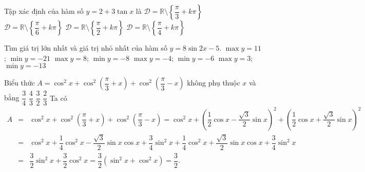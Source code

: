 \begin{ex}%
Tập xác định của hàm số $y=2+3\tan x$ là
\choice
{$\mathscr{D}=\mathbb{R}\setminus\left\{\dfrac{\pi}{3}+k\pi\right\}$}
{$\mathscr{D}=\mathbb{R}\setminus\left\{\dfrac{\pi}{6}+k\pi\right\}$}
{\True $\mathscr{D}=\mathbb{R}\setminus\left\{\dfrac{\pi}{2}+k\pi\right\}$}
{$\mathscr{D}=\mathbb{R}\setminus\left\{\dfrac{\pi}{4}+k\pi\right\}$}
\end{ex}

\begin{ex}%
Tìm giá trị lớn nhất và giá trị nhỏ nhất của hàm số $y=8 \sin 2 x-5$.
\choice
{$\max y=11$; $\min y=-21$}
{$\max y=8$; $\min y=-8$}
{$\max y=-4$; $\min y=-6$}
{\True $\max y=3$; $\min y=-13$}
\end{ex}

\begin{ex}%
Biểu thức $A=\cos^2x+\cos^2\left(\dfrac{\pi }{3}+x \right)+\cos^2\left(\dfrac{\pi }{3}-x \right)$ không phụ thuộc $x$ và bằng
\choice
{$\dfrac{3}{4}$}
{$\dfrac{4}{3}$}
{\True $\dfrac{3}{2}$}
{$\dfrac{2}{3}$}
\loigiai
{
Ta có
\allowdisplaybreaks
\begin{eqnarray*}
A &=& \cos^2 x+\cos^2\left(\dfrac{\pi}{3}+x\right)+\cos^2 \left(\dfrac{\pi}{3}-x\right) =\cos^2x+\left( \dfrac{1}{2}\cos x-\dfrac{\sqrt{3}}{2}\sin x \right)^2+\left( \dfrac{1}{2}\cos x+\dfrac{\sqrt{3}}{2}\sin x \right)^2\\
&=& \cos^2 x+\dfrac{1}{4}\cos^2 x-\dfrac{\sqrt{3}}{2}\sin x\cos  x+\dfrac{3}{4}\sin^2 x+\dfrac{1}{4}\cos^2 x+\dfrac{\sqrt{3}}{2}\sin x\cos x+\dfrac{3}{4}\sin^2 x\\
&=& \dfrac{3}{2}\sin^2 x+\dfrac{3}{2}\cos^2 x = \dfrac{3}{2}\left(\sin^2 x+\cos^2 x\right) = \dfrac{3}{2}.
\end{eqnarray*}
}
\end{ex}

